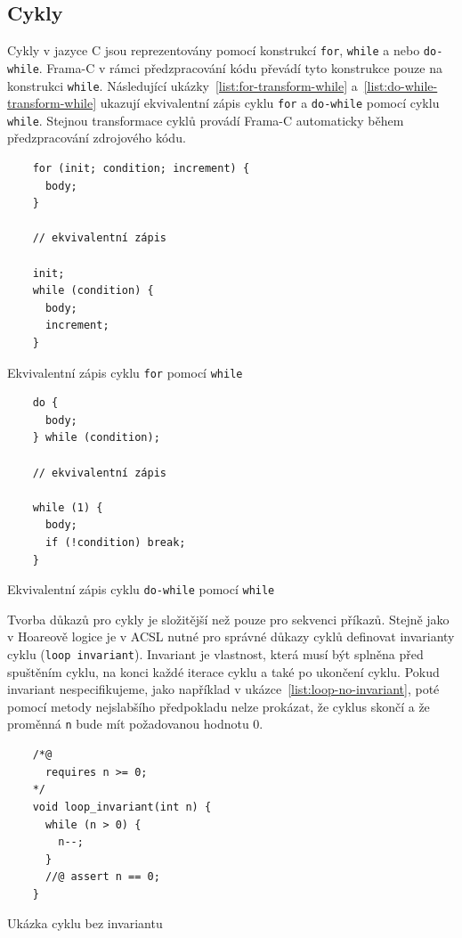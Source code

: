 \subsection{Cykly}
\label{subsec:acsl-cykly}

Cykly v jazyce C jsou reprezentovány pomocí konstrukcí \texttt{for}, \texttt{while} a nebo \texttt{do-while}.
Frama\mbox{-}C v rámci předzpracování kódu převádí tyto konstrukce pouze na konstrukci \texttt{while}.
Následující ukázky~\ref{list:for-transform-while} a~\ref{list:do-while-transform-while}
ukazují ekvivalentní zápis cyklu \texttt{for} a \texttt{do-while} pomocí cyklu \texttt{while}.
Stejnou transformace cyklů provádí Frama\mbox{-}C automaticky během předzpracování zdrojového kódu.

\begin{listing}[H]
    \begin{verbatim}
    for (init; condition; increment) {
      body;
    }

    // ekvivalentní zápis

    init;
    while (condition) {
      body;
      increment;
    }
    \end{verbatim}
    \caption{Ekvivalentní zápis cyklu \texttt{for} pomocí \texttt{while}}
    \label{list:for-transform-while}
\end{listing}

\begin{listing}[H]
    \begin{verbatim}
    do {
      body;
    } while (condition);

    // ekvivalentní zápis

    while (1) {
      body;
      if (!condition) break;
    }
    \end{verbatim}
    \caption{Ekvivalentní zápis cyklu \texttt{do-while} pomocí \texttt{while}}
    \label{list:do-while-transform-while}
\end{listing}

Tvorba důkazů pro cykly je složitější než pouze pro sekvenci příkazů.
Stejně jako v Hoareově logice je v ACSL nutné pro správné důkazy cyklů definovat invarianty cyklu (\texttt{loop invariant}).
Invariant je vlastnost, která musí být splněna před spuštěním cyklu,
na konci každé iterace cyklu a také po ukončení cyklu.
Pokud invariant nespecifikujeme, jako například v ukázce~\ref{list:loop-no-invariant},
poté pomocí metody nejslabšího předpokladu nelze prokázat,
že cyklus skončí a že proměnná \texttt{n} bude mít požadovanou hodnotu 0.

\begin{listing}[H]
    \begin{verbatim}
    /*@
      requires n >= 0;
    */
    void loop_invariant(int n) {
      while (n > 0) {
        n--;
      }
      //@ assert n == 0;
    }
    \end{verbatim}
    \caption{Ukázka cyklu bez invariantu}
    \label{list:loop-no-invariant}
\end{listing}

